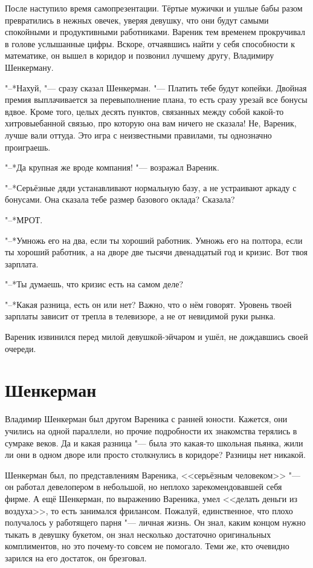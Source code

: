 После наступило время самопрезентации.
Тёртые мужички и ушлые бабы разом превратились в нежных овечек, уверяя девушку, что они будут самыми спокойными и продуктивными работниками.
Вареник тем временем прокручивал в голове услышанные цифры.
Вскоре, отчаявшись найти у себя способности к математике, он вышел в коридор и позвонил лучшему другу, Владимиру Шенкерману.

"--*Нахуй, "--- сразу сказал Шенкерман.
"--- Платить тебе будут копейки.
Двойная премия выплачивается за перевыполнение плана, то есть сразу урезай все бонусы вдвое.
Кроме того, целых десять пунктов, связанных между собой какой-то хитровыебанной связью, про которую она вам ничего не сказала!
Не, Вареник, лучше вали оттуда.
Это игра с неизвестными правилами, ты однозначно проиграешь.

"--*Да крупная же вроде компания! "--- возражал Вареник.

"--*Серьёзные дяди устанавливают нормальную базу, а не устраивают аркаду с бонусами.
Она сказала тебе размер базового оклада?
Сказала?

"--*МРОТ.

"--*Умножь его на два, если ты хороший работник.
Умножь его на полтора, если ты хороший работник, а на дворе две тысячи двенадцатый год и кризис.
Вот твоя зарплата.

"--*Ты думаешь, что кризис есть на самом деле?

"--*Какая разница, есть он или нет?
Важно, что о нём говорят.
Уровень твоей зарплаты зависит от трепла в телевизоре, а не от невидимой руки рынка.

Вареник извинился перед милой девушкой-эйчаром и ушёл, не дождавшись своей очереди.

\section{Шенкерман}

Владимир Шенкерман был другом Вареника с ранней юности.
Кажется, они учились на одной параллели, но прочие подробности их знакомства терялись в сумраке веков.
Да и какая разница "--- была это какая-то школьная пьянка, жили ли они в одном дворе или просто столкнулись в коридоре?
Разницы нет никакой.

Шенкерман был, по представлениям Вареника, <<серьёзным человеком>> "--- он работал девелопером в небольшой, но неплохо зарекомендовавшей себя фирме.
А ещё Шенкерман, по выражению Вареника, умел <<делать деньги из воздуха>>, то есть занимался фрилансом.
Пожалуй, единственное, что плохо получалось у работящего парня "--- личная жизнь.
Он знал, каким концом нужно тыкать в девушку букетом, он знал несколько достаточно оригинальных комплиментов, но это почему-то совсем не помогало.
Теми же, кто очевидно зарился на его достаток, он брезговал.

